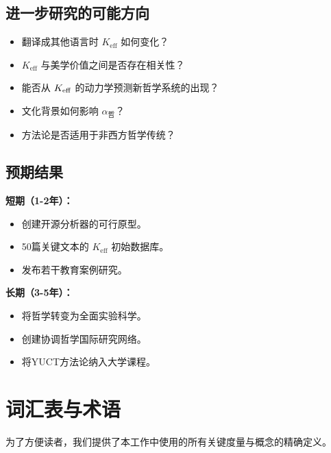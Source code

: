 \documentclass[11pt,a4paper]{article}
\begin{document}
	\subsection{进一步研究的可能方向}
	
	\begin{itemize}
		\item 翻译成其他语言时 \(K_{\mathrm{eff}}\) 如何变化？
		\item \(K_{\mathrm{eff}}\) 与美学价值之间是否存在相关性？
		\item 能否从 \(\Keff\) 的动力学预测新哲学系统的出现？
		\item 文化背景如何影响 \(\alpha_{\text{哲}}\)？
		\item 方法论是否适用于非西方哲学传统？
	\end{itemize}
	
	\subsection{预期结果}
	
	\textbf{短期（1-2年）：}
	\begin{itemize}
		\item 创建开源分析器的可行原型。
		\item 50篇关键文本的 \(K_{\mathrm{eff}}\) 初始数据库。
		\item 发布若干教育案例研究。
	\end{itemize}
	
	\textbf{长期（3-5年）：}
	\begin{itemize}
		\item 将哲学转变为全面实验科学。
		\item 创建协调哲学国际研究网络。
		\item 将YUCT方法论纳入大学课程。
	\end{itemize}
	
	\section{词汇表与术语}
	\label{sec:glossary}
	
	为了方便读者，我们提供了本工作中使用的所有关键度量与概念的精确定义。
	
\end{document}
